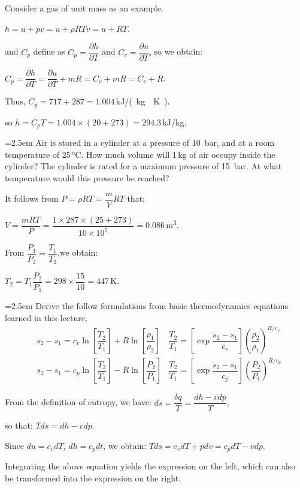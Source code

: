 \documentclass[12pt]{article}
\newlength{\questionlabelwidth}
\newcommand{\question}[2]{%
  \par\noindent
  {\hangindent=2.5em %
   \hangafter=1 %
   \makebox[\questionlabelwidth][l]{\textbf{#1}}#2\par}%
}
\begin{document}
\begin{answerbox}
Consider a gas of unit mass as an example.

$h=u+pv=u+\rho RTv=u+RT$.

and $C_p$ define as $C_p=\dfrac{\partial h}{\partial T}$ and $C_v=\dfrac{\partial u}{\partial T}$, so we obtain:

$C_p=\dfrac{\partial h}{\partial T}=\dfrac{\partial u}{\partial T}+mR=C_v+mR=C_v+R$.

Thus, $C_p=717+287=1.004$\,\si{kJ/(kg\cdot K)}.

so $h=C_pT=1.004\times (20+273)=294.3$\,\si{kJ/kg}.
\end{answerbox}

\question{1.3}{Air is stored in a cylinder at a pressure of 10 \,\si{bar}, and at a room temperature of 25\,\si{\celsius}. How much
volume will 1\,\si{kg} of air occupy inside the cylinder? The cylinder is rated for a maximum pressure of 15 \,\si{bar}. At what temperature would this pressure be reached?}

\begin{answerbox}
It follows from $P=\rho RT=\dfrac{m}{V}RT$ that:

$V=\dfrac{mRT}{P}=\dfrac{1\times 287\times (25+273)}{10\times 10^5}=0.086$\,\si{m^3}.

From $\dfrac{P_1}{P_2}=\dfrac{T_1}{T_2}$,we obtain:

$T_2=T_1\dfrac{P_2}{P_1}=298\times \dfrac{15}{10}=447$\,\si{K}.
\end{answerbox}

\question{1.4}{Derive the follow formulations from basic thermodynamics equations learned in this lecture,
\begin{align*}
  &s_2-s_1=c_v\ln\left[\dfrac{T_2}{T_1}\right]+R\ln\left[\dfrac{\rho_1}{\rho_2}\right] &\dfrac{T_2}{T_1}=\left[\exp\dfrac{s_2-s_1}{c_v}\right]\left(\dfrac{\rho_2}{\rho_1}\right)^{R/c_v} \\
  &s_2-s_1=c_p\ln\left[\dfrac{T_2}{T_1}\right]-R\ln\left[\dfrac{P_2}{P_1}\right] &\dfrac{T_2}{T_1}=\left[\exp\dfrac{s_2-s_1}{c_p}\right]\left(\dfrac{P_2}{P_1}\right)^{R/c_p}
\end{align*}
}
\begin{answerbox}
From the definition of entropy, we have: $ds=\dfrac{\delta q}{T}=\dfrac{dh-vdp}{T}$,

so that: $Tds=dh-vdp$.

Since $du=c_vdT$, $dh=c_pdt$, we obtain: $Tds=c_vdT+pdv=c_pdT-vdp$.

Integrating the above equation yields the expression on the left, which can also be transformed into the expression on the right.
\end{answerbox}
\end{document}
